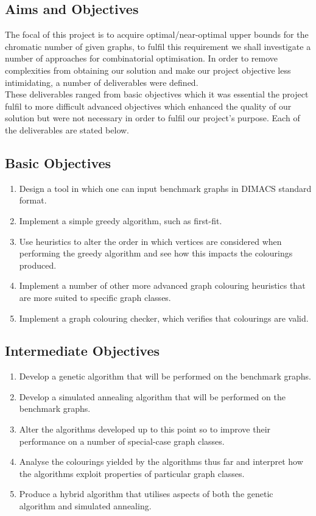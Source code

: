 \documentclass[12pt,a4paper]{article}
\begin{document}
\subsection*{Aims and Objectives}
\par The focal of this project is to acquire optimal/near-optimal upper bounds for the chromatic number of given graphs, to fulfil this requirement we shall investigate a number of approaches for combinatorial optimisation. In order to  remove complexities from obtaining our solution and make our project objective less intimidating, a number of deliverables were defined. \\
These deliverables ranged from basic objectives which it was essential the project fulfil to more difficult advanced objectives which enhanced the quality of our solution but were not necessary in order to fulfil our project's purpose. Each of the deliverables are stated below.
\subsection*{Basic Objectives}
\begin{enumerate}[label = \textbf{B\arabic*}]
\itemsep0em
\item Design a tool in which one can input benchmark graphs in DIMACS standard format. \label{obj:B1}
\item Implement a simple greedy algorithm, such as first-fit.  \label{obj:B2}
\item Use heuristics to alter the order in which vertices are considered when performing the greedy algorithm and see how this impacts the colourings produced. \label{obj:B3}
\item Implement a number of other more advanced graph colouring heuristics that are more suited to specific graph classes. \label{obj:B4}
\item Implement a graph colouring checker, which verifies that colourings are valid. \label{obj:B5}
\end{enumerate}

\subsection*{Intermediate Objectives}
\begin{enumerate}[label = \textbf{I\arabic*}]
\itemsep0em
\item Develop a genetic algorithm that will be performed on the benchmark graphs. \label{obj:I1}
\item Develop a simulated annealing algorithm that will be performed on the benchmark graphs. \label{obj:I2}
\item Alter the algorithms developed up to this point so to improve their performance on a number of special-case graph classes. \label{obj:I3}
\item Analyse the colourings yielded by the algorithms thus far and interpret how the algorithms exploit properties of particular graph classes. \label{obj:I4}
\item Produce a hybrid algorithm that utilises aspects of both the genetic algorithm and simulated annealing. \label{obj:I5}
\end{enumerate}  
\end{document}
